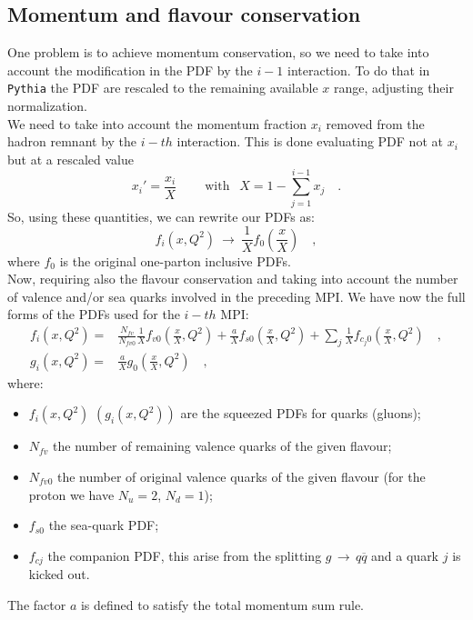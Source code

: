 \subsection{Momentum and flavour conservation}

One problem is to achieve momentum conservation, so we need to take into account the modification in the PDF by the $i-1$ interaction. To do that in \texttt{Pythia} the PDF are rescaled to the remaining available $x$ range, adjusting their normalization.
\\
We need to take into account the momentum fraction $x_i$ removed from the hadron remnant by the $i-th$ interaction. This is done evaluating PDF not at $x_i$ but at a rescaled value
\begin{equation}
	x_i'=\frac{x_i}{X} \qquad \ \text{with }\ \ X=1-\sum_{j=1}^{i-1}x_j\quad .
\end{equation}
So, using these quantities, we can rewrite our PDFs as:
\begin{equation}
	f_i(x,Q^2)\ \longrightarrow\ \frac{1}{X}f_0\left(\frac{x}{X}\right)\quad ,
\end{equation}
where $f_0$ is the original one-parton inclusive PDFs.
\\
Now, requiring also the flavour conservation and taking into account the number of valence and/or sea quarks involved in the preceding MPI. We have now the full forms of the PDFs used for the $i-th$ MPI:
\begin{align}
f_i(x,Q^2) =&  \frac{N_{fv}}{N_{fv0}}\frac{1}{X} f_{v0}\left( \frac{x}{X},Q^2 \right) + \frac{a}{X}f_{s0}\left( \frac{x}{X},Q^2 \right)+\displaystyle\sum_j \frac{1}{X} f_{c_j0}\left( \frac{x}{X},Q^2 \right) \quad,\\
g_i(x,Q^2) =& \frac{a}{X}g_0\left( \frac{x}{X},Q^2 \right)\quad, 
\end{align}
where: 
\begin{itemize}
	\item $f_i(x,Q^2)$ $(g_i(x,Q^2))$ are the squeezed PDFs for quarks (gluons);
	\item $N_{fv}$ the number of remaining valence quarks of the given flavour;
	\item $N_{fv0}$ the number of original valence quarks of the given flavour (for the proton we have $N_u=2$, $N_d=1$);
	\item $f_{s0}$ the sea-quark PDF;
	\item $f_{cj}$ the companion PDF, this arise from the splitting $g\,\rightarrow\,q\overline{q}$ and a quark $j$ is kicked out.
\end{itemize}
The factor $a$ is defined to satisfy the total momentum sum rule.

